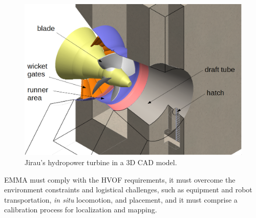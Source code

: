 \begin{figure}[h!]
\centering
	\includegraphics[width=\columnwidth]{figs/problem/ambiente_3d.PNG} 
	\caption{Jirau's hydropower turbine in a 3D CAD model.}
	\label{fig::ambiente3d}
\end{figure}

EMMA must comply with the HVOF requirements, it must overcome the environment
constraints and logistical challenges, such as equipment
and robot transportation, \textit{in situ} locomotion, and placement, and it
must comprise a calibration process for localization and mapping.

